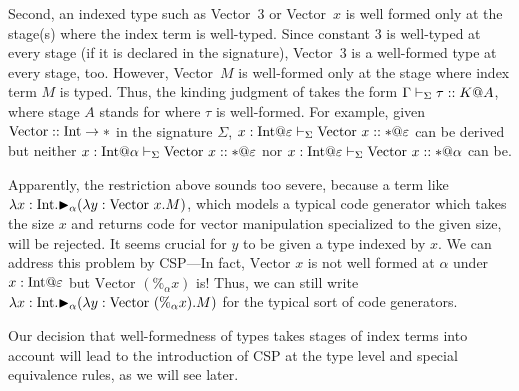 Second, an indexed type such as Vector\ 3 or Vector\ $x$ is well formed only at
the stage(s) where the index term is well-typed.  Since constant \(3\) is
well-typed at every stage (if it is declared in the signature), Vector\ 3 is a
well-formed type at every stage, too.  However, Vector\ $M$ is well-formed only
at the stage where index term $M$ is typed.  Thus, the kinding judgment of \LMD
takes the form \(\Gamma\vdash_\Sigma \tau :: K @ A\), where stage $A$ stands for where
\(\tau\) is well-formed.  For example, given \(\text{Vector}:: \textrm{Int} \rightarrow
*\) in the signature \(\Sigma\), \(x:\I@\varepsilon \V \text{Vector }x :: *
@\varepsilon\) can be derived but neither \(x:\I@\alpha \V \text{Vector }x :: *
@\varepsilon\) nor \(x:\I@\varepsilon \V \text{Vector }x :: * @\alpha\) can be.


Apparently, the restriction above sounds too severe, because a term like
\(\lambda x:\textrm{Int}. {\mathop{\blacktriangleright}}_\alpha (\lambda y:\text{Vector }x.M) \), which models a
typical code generator which takes the size $x$ and returns code for vector
manipulation specialized to the given size, will be rejected. It seems crucial
for \(y\) to be given a type indexed by $x$. We can address this problem by
CSP---In fact, $\text{Vector }x$ is not well formed at $\alpha$ under
$x:\I@\varepsilon$ but $\text{Vector }(\%_\alpha x)$ is!  Thus, we can still
write \(\lambda x:\textrm{Int}. {\mathop{\blacktriangleright}}_\alpha (\lambda y:\text{Vector }(\%_\alpha x).M) \)
for the typical sort of code generators.


Our decision that well-formedness of types takes stages of index terms into
account will lead to the introduction of CSP at the type level and special
equivalence rules, as we will see later.
